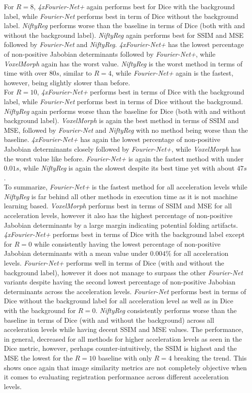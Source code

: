 \documentclass[english,version-2022-01]{uzl-thesis} %
\begin{document}
For $R=8$, \emph{4xFourier-Net+} again performs best for Dice with the background label, while \emph{Fourier-Net} performs best in term of Dice without the background label. \emph{NiftyReg} performs worse than the baseline in terms of Dice (both with and without the background label). \emph{NiftyReg} again performs best for SSIM and MSE followed by \emph{Fourier-Net} and \emph{NiftyReg}. \emph{4xFourier-Net+} has the lowest percentage of non-positive Jabobian determinants followed by \emph{Fourier-Net+}, while \emph{VoxelMorph} again has the worst value. \emph{NiftyReg} is the worst method in terms of time with over $80s$, similar to $R=4$, while \emph{Fourier-Net+} again is the fastest, however, being slightly slower than before.\\
For $R=10$, \emph{4xFourier-Net+} performs best in terms of Dice with the background label, while \emph{Fourier-Net} performs best in terms of Dice without the background. \emph{NiftyReg} again performs worse than the baseline for Dice (both with and without background label). \emph{VoxelMorph} is again the best method in terms of SSIM and MSE, followed by \emph{Fourier-Net} and \emph{NiftyReg} with no method being worse than the baseline. \emph{4xFourier-Net+} has again the lowest percentage of non-positive Jabobian determinants closely followed by \emph{Fourier-Net+}, while \emph{VoxelMorph} has the worst value like before. \emph{Fourier-Net+} is again the fastest method with under $0.01s$, while \emph{NiftyReg} is again the slowest despite its best time yet with about $47s$.\\
To summarize, \emph{Fourier-Net+} is the fastest method for all acceleration levels while \emph{NiftyReg} is far behind all other methods in 
execution time as it is not machine learning based. \emph{VoxelMorph} performs best in terms of SSIM and MSE for all acceleration levels, however it also has the highest percentage of non-positive Jabobian determinants by a large margin indicating potential folding artifacts. \emph{4xFourier-Net+} performs best in terms of Dice with the background label except for $R=0$ while consistently having the lowest percentage of non-positive Jabobian determinants with a mean value under $0.004\%$ for all acceleration levels. \emph{Fourier-Net+} performs well in terms of Dice (with and without the background label), however it does not manage to surpass the other \emph{Fourier-Net} variants despite having the second lowest percentage of non-positive Jabobian determinants across the acceleration levels. \emph{Fourier-Net} performs best in terms of Dice without the background label for all acceleration level as well as in Dice with the background for $R=0$. \emph{NiftyReg} consistently performs worse than the baseline in terms of Dice (with and without the background) across all acceleration levels while having decent SSIM and MSE values. The performance, in general, decreased for all methods for higher acceleration levels as seen in the Dice metric, however, perhaps counter-intuitively, the SSIM is highest and the MSE the lowest for the $R=10$ baseline with only $R=4$ breaking the trend. This shows once again that image similarity metrics are not completely objective when it comes to evaluating registration performance across different acceleration levels.\\
\end{document}
